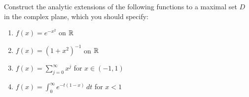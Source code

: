 \begin{exercise} \label{exr:prelims:extensions}
  Construct the analytic extensions of the following functions
  to a maximal set $D$ in  the complex plane, which you should specify:
  \begin{enumerate} \ilist
    \item $f(x) = e^{-x^2}$ on $\mathbb{R}$
    \item $f(x) = (1+x^2)^{-1}$ on $\mathbb{R}$
    \item $f(x) = \sum_{j = 0}^\infty x^j$ for $x \in (-1,1)$
    \item $f(x) = \int_0^\infty e^{-t (1-x)} \,dt$ for $x < 1$
  \end{enumerate}
\end{exercise}

